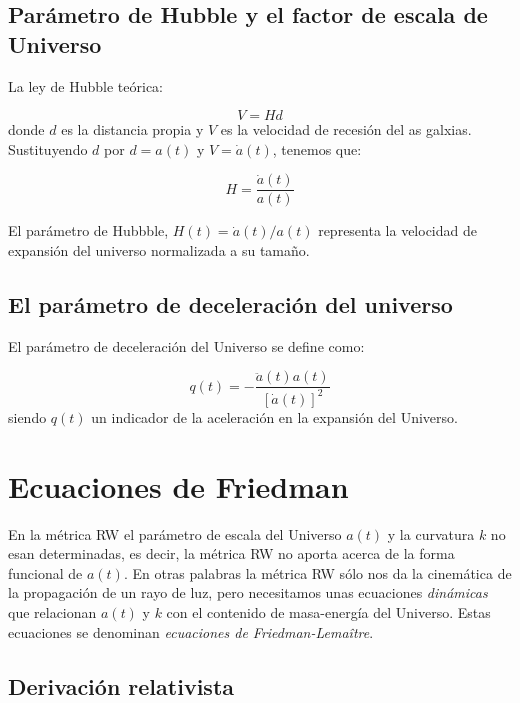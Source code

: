\subsection{Parámetro de Hubble y el factor de escala de Universo}

La ley de Hubble teórica:

\begin{equation}
    V = H d 
\end{equation}
donde $d$ es la distancia propia y $V$ es la velocidad de recesión del as galxias. Sustituyendo $d$ por $d=a(t)$ y $V=\dot{a}(t)$, tenemos que:

\begin{equation}
    H = \frac{\dot{a}(t)}{a(t)}
\end{equation}


\begin{Anotacion}
    El parámetro de Hubbble, $H(t)=\dot{a}(t)/a(t)$ representa la velocidad de expansión del universo normalizada a su tamaño.
\end{Anotacion}


\subsection{El parámetro de deceleración del universo}

El parámetro de deceleración del Universo se define como:

\begin{equation}
    q(t) = - \frac{\ddot{a}(t)a(t)}{[\dot{a}(t)]^2}
\end{equation}
siendo $q(t)$ un indicador de la aceleración en la expansión del Universo.



\section{Ecuaciones de Friedman}


En la métrica RW el parámetro de escala del Universo $a(t)$ y la curvatura $k$ no esan determinadas, es decir, la métrica RW no aporta acerca de la forma funcional de $a(t)$. En otras palabras la métrica RW sólo nos da la cinemática de la propagación de un rayo de luz, pero necesitamos unas ecuaciones \textit{dinámicas} que relacionan $a(t)$ y $k$ con el contenido de masa-energía del Universo. Estas ecuaciones se denominan \textit{ecuaciones de Friedman-Lemaître}.

\subsection{Derivación relativista}

